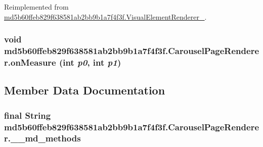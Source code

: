 Reimplemented from \hyperlink{classmd5b60ffeb829f638581ab2bb9b1a7f4f3f_1_1_visual_element_renderer__1_8c7af843aeec04827cb3a3981ea1978d}{md5b60ffeb829f638581ab2bb9b1a7f4f3f.VisualElementRenderer\_}.\hypertarget{classmd5b60ffeb829f638581ab2bb9b1a7f4f3f_1_1_carousel_page_renderer_5bd9181559c99a4fe32a57d915ec6751}{
\subsubsection[{onMeasure}]{\setlength{\rightskip}{0pt plus 5cm}void md5b60ffeb829f638581ab2bb9b1a7f4f3f.CarouselPageRenderer.onMeasure (int {\em p0}, \/  int {\em p1})}}
\label{classmd5b60ffeb829f638581ab2bb9b1a7f4f3f_1_1_carousel_page_renderer_5bd9181559c99a4fe32a57d915ec6751}




\subsection{Member Data Documentation}
\hypertarget{classmd5b60ffeb829f638581ab2bb9b1a7f4f3f_1_1_carousel_page_renderer_a7c3e4156a49e5c3fe304722e1b5019c}{
\subsubsection[{\_\-\_\-md\_\-methods}]{\setlength{\rightskip}{0pt plus 5cm}final String {\bf md5b60ffeb829f638581ab2bb9b1a7f4f3f.CarouselPageRenderer.\_\-\_\-md\_\-methods}}}
\label{classmd5b60ffeb829f638581ab2bb9b1a7f4f3f_1_1_carousel_page_renderer_a7c3e4156a49e5c3fe304722e1b5019c}




